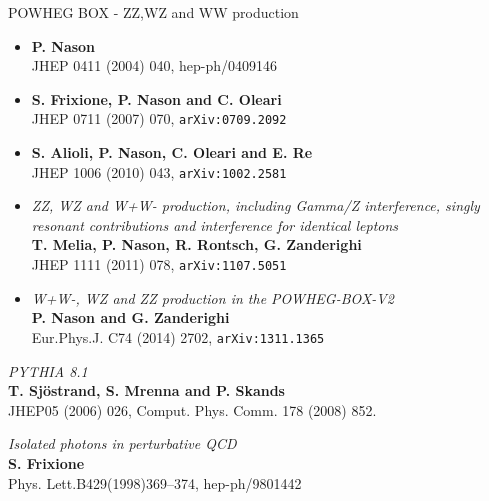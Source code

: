\documentclass[11pt,a4paper,final]{report}
\begin{document}
\begin{thebibliography}{9}
	POWHEG BOX - ZZ,WZ and WW production
	\begin{itemize}
	\item \textbf{P. Nason}\\
	JHEP 0411 (2004) 040, hep-ph/0409146
	\item \textbf{S. Frixione, P. Nason and C. Oleari}\\
	JHEP 0711 (2007) 070, \texttt{arXiv:0709.2092}
	\item \textbf{S. Alioli, P. Nason, C. Oleari and E. Re}\\
	JHEP 1006 (2010) 043, \texttt{arXiv:1002.2581}
	\item \textit{ZZ, WZ and W+W- production, including Gamma/Z interference, singly resonant contributions and interference for identical leptons}\\
	\textbf{T. Melia, P. Nason, R. Rontsch, G. Zanderighi}\\
	JHEP 1111 (2011) 078, \texttt{arXiv:1107.5051}
	\item \textit{W+W-, WZ and ZZ production in the POWHEG-BOX-V2}\\
	\textbf{P. Nason and G. Zanderighi}\\
	Eur.Phys.J. C74 (2014) 2702, \texttt{arXiv:1311.1365}
	\end{itemize}
	
	\textit{PYTHIA 8.1}\\
	\textbf{T. Sjöstrand, S. Mrenna and P. Skands}\\
	JHEP05 (2006) 026, Comput. Phys. Comm. 178 (2008) 852. 

	
	\textit{Isolated photons in perturbative QCD}\\	
	\textbf{S. Frixione}\\
	Phys. Lett.B429(1998)369–374, hep-ph/9801442
	
	
\end{thebibliography}
\end{document}
